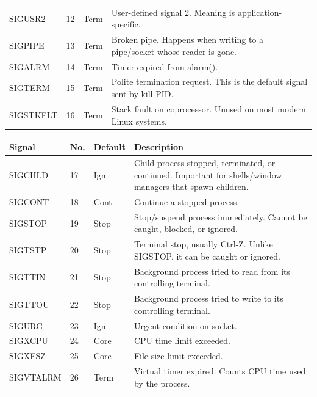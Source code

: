 \documentclass{report}
\begin{document}
\begin{itemize}
\begin{center}
\begin{tabularx}{\textwidth}{@{}lllX@{}}
                        SIGUSR2	&12	&Term	&User-defined signal 2. Meaning is application-specific.\\[2ex]
                        SIGPIPE	&13	&Term	&Broken pipe. Happens when writing to a pipe/socket whose reader is gone.\\[2ex]
                        SIGALRM	&14	&Term	&Timer expired from alarm().\\[2ex]
                        SIGTERM	&15	&Term	&Polite termination request. This is the default signal sent by kill PID.\\[2ex]
                        SIGSTKFLT	&16	&Term	&Stack fault on coprocessor. Unused on most modern Linux systems. \\
                        \bottomrule
                    \end{tabularx}
                \end{center}
                \begin{center}
                    \begin{tabularx}{\textwidth}{@{}lllX@{}}
                        \toprule
                        \textbf{Signal}&	\textbf{No.}&	\textbf{Default}&	\textbf{Description} \\
                        \midrule
                        SIGCHLD	&17	&Ign	&Child process stopped, terminated, or continued. Important for shells/window managers that spawn children.\\[2ex]
                        SIGCONT	&18	&Cont	&Continue a stopped process.\\[2ex]
                        SIGSTOP	&19	&Stop	&Stop/suspend process immediately. Cannot be caught, blocked, or ignored.\\[2ex]
                        SIGTSTP	&20	&Stop	&Terminal stop, usually Ctrl-Z. Unlike SIGSTOP, it can be caught or ignored.\\[2ex]
                        SIGTTIN	&21	&Stop	&Background process tried to read from its controlling terminal.\\[2ex]
                        SIGTTOU	&22	&Stop	&Background process tried to write to its controlling terminal.\\[2ex]
                        SIGURG	&23	&Ign	&Urgent condition on socket.\\[2ex]
                        SIGXCPU	&24	&Core	&CPU time limit exceeded.\\[2ex]
                        SIGXFSZ	&25	&Core	&File size limit exceeded.\\[2ex]
                        SIGVTALRM	&26	&Term	&Virtual timer expired. Counts CPU time used by the process. \\ 

\end{tabularx}
\end{center}
\end{itemize}
\end{document}
